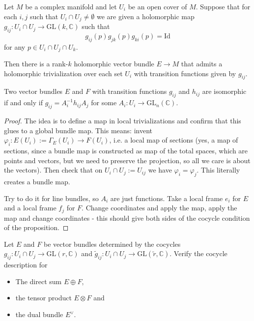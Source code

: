 \begin{proposition}
\label{proposition-vecto-bundl-cocyc}
Let $M$ be a complex manifold and let $U_i$
be an open cover of $M$.
Suppose that for each $i,j$ such that $U_i
\cap U_j \neq \emptyset$
we are given a holomorphic map $g_{ij}:U_i
\cap U_j \to \text{GL}(k,\mathbb{C})$
such that
$$
g_{ij}(p)g_{jk}(p)g_{ki}(p)=\text{Id}
$$
for any $p \in U_i\cap U_j\cap U_k$.

Then there is a rank-$k$ holomorphic vector
bundle $E \to M$
that admits a holomorphic trivialization over
each set $U_i$
with transition functions given by $g_{ij}$.
\end{proposition}

\begin{proposition}
\label{proposition-isomo-vecto-bundl}
\begin{reference}
\cite[Proposition 3.7]{lec}
\end{reference}
Two vector bundles $E$ and $F$
with transition functions $g_{ij}$ and
$h_{ij}$
are isomorphic if and only if
$g_{ij}=A^{-1}_ih_{ij}A_j$
for some $A_i:U_i \to
\text{GL}_n(\mathbb{C})$.
\end{proposition}

\begin{proof}
The idea is to define a map in local
trivializations
and confirm that this glues to a global
bundle map.
This means: invent
$\varphi_i:E(U_i):=\Gamma_E(U_i) \to F(U_i)$,
i.e. a local map of sections
(yes, a map of sections, since a bundle map
is constructed as map of the total spaces,
which are points and vectors,
but we need to preserve the projection,
so all we care is about the vectors).
Then check that on $U_i\cap U_j:= U_{ij}$
we have $\varphi_i=\varphi_j$.
This literally creates a bundle map.

Try to do it for line bundles,
so $A_i$ are just functions.
Take a local frame $e_i$ for $E$
and a local frame $f_j$ for $F$.
Change coordinates and apply the map,
apply the map and change coordinates
- this should give both sides of the cocycle
condition
of the proposition.
\end{proof}

\begin{exercise}
\label{exercise-tensor-product-bundle}
\begin{reference}
\cite[Exercise 2.2.1]{huc}
\end{reference}
Let $E$ and $F$ be vector bundles determined
by the cocycles
$g_{ij}: U_i \cap U_j \to
\text{GL}(r,\mathbb{C})$
and $\tilde{g}_{ij}:U_i \cap U_j \to
\text{GL}(\tilde{r},\mathbb{C})$.
Verify the cocycle description for
\begin{itemize}
\item The direct sum $E \oplus F$,
\item the tensor product $E \otimes F$ and
\item the dual bundle $E^\vee$.
\end{itemize}
\end{exercise}

